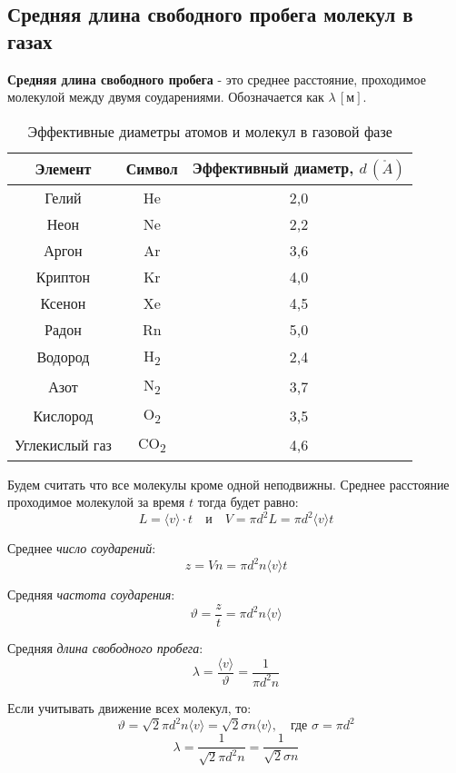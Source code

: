 \subsection{Средняя длина свободного пробега молекул в газах}

\textbf{Средняя длина свободного пробега} - это среднее расстояние, проходимое молекулой между двумя соударениями. Обозначается как $\lambda \, [\text{м}]$.

\begin{table}[h]
	\centering
	\caption{Эффективные диаметры атомов и молекул в газовой фазе}
	\begin{tabular}{|c|c|c|}
		\hline
		\textbf{Элемент} & \textbf{Символ} & \textbf{Эффективный диаметр, \( d \, (\mathring{A})\) } \\
		\hline
		Гелий & He & 2,0 \\
		Неон & Ne & 2,2 \\
		Аргон & Ar & 3,6 \\
		Криптон & Kr & 4,0 \\
		Ксенон & Xe & 4,5 \\
		Радон & Rn & 5,0 \\
		\hline
		Водород & H\textsubscript{2} & 2,4 \\
		Азот & N\textsubscript{2} & 3,7 \\
		Кислород & O\textsubscript{2} & 3,5 \\
		Углекислый газ & CO\textsubscript{2} & 4,6 \\
		\hline
	\end{tabular}
	\label{tab:diameters}
\end{table}

Будем считать что все молекулы кроме одной неподвижны. Среднее расстояние проходимое молекулой за время $t$ тогда будет равно:
\[
L = \langle v\rangle \cdot t \quad \text{и} \quad V = \pi d^2 L = \pi d^2 \langle v \rangle t
\]

Среднее \textit{число соударений}:
\[
z = Vn = \pi d^2 n \langle v\rangle t
\]

Средняя \textit{частота соударения}:
\[
\vartheta = \frac{z}{t} = \pi d^2 n \langle v \rangle
\]

Средняя \textit{длина свободного пробега}:
\[
\lambda = \frac{\langle v \rangle}{\vartheta} = \frac{1}{\pi d^2 n}
\]

Если учитывать движение всех молекул, то:
\[
\vartheta = \sqrt{2} \pi d^2 n \langle v \rangle = \sqrt{2}\sigma n \langle v \rangle, \quad \text{где } \sigma = \pi d^2
\]
\[
\lambda = \frac{1}{\sqrt{2} \pi d^2 n} = \frac{1}{\sqrt{2} \sigma n}
\]

